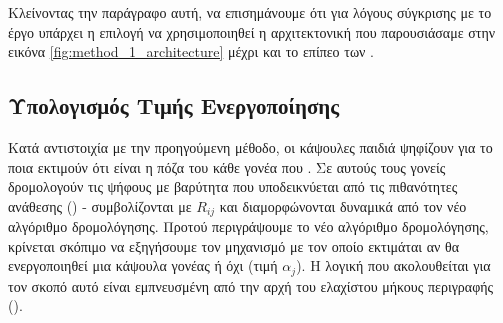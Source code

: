 Κλείνοντας την παράγραφο αυτή, να επισημάνουμε ότι για λόγους σύγκρισης με το έργο \cite{sabour2017dynamic} υπάρχει η επιλογή να χρησιμοποιηθεί η αρχιτεκτονική που παρουσιάσαμε στην εικόνα \ref{fig:method_1_architecture} μέχρι και το επίπεο των .

\subsection{Υπολογισμός Τιμής Ενεργοποίησης}

Κατά αντιστοιχία με την προηγούμενη μέθοδο, οι κάψουλες παιδιά ψηφίζουν για το ποια εκτιμούν ότι είναι η πόζα του κάθε γονέα που . Σε αυτούς τους γονείς δρομολογούν τις ψήφους με βαρύτητα που υποδεικνύεται από τις πιθανότητες ανάθεσης () - συμβολίζονται με $R_{ij}$ και διαμορφώνονται δυναμικά από τον νέο αλγόριθμο δρομολόγησης. Προτού περιγράψουμε το νέο αλγόριθμο δρομολόγησης, κρίνεται σκόπιμο να εξηγήσουμε τον μηχανισμό με τον οποίο εκτιμάται αν θα ενεργοποιηθεί μια κάψουλα γονέας ή όχι (τιμή $\alpha_j$). Η λογική που ακολουθείται για τον σκοπό αυτό είναι εμπνευσμένη από την αρχή του ελαχίστου μήκους περιγραφής ().\par

